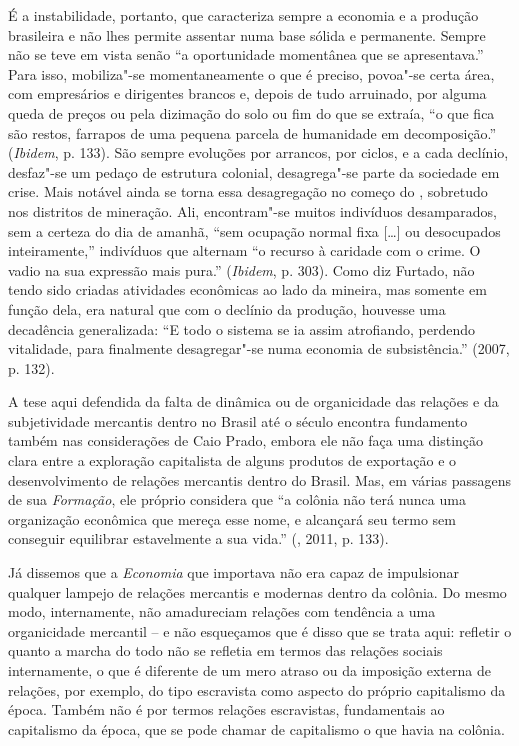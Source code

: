 É a instabilidade, portanto, que caracteriza sempre a economia e a
produção brasileira e não lhes permite assentar numa base sólida e
permanente. Sempre não se teve em vista senão ``a oportunidade
momentânea que se apresentava.'' Para isso, mobiliza"-se momentaneamente
o que é preciso, povoa"-se certa área, com empresários e dirigentes
brancos e, depois de tudo arruinado, por alguma queda de preços ou pela
dizimação do solo ou fim do que se extraía, ``o que fica são restos,
farrapos de uma pequena parcela de humanidade em decomposição.''
(\emph{Ibidem}, p. 133). São sempre evoluções por arrancos, por ciclos,
e a cada declínio, desfaz"-se um pedaço de estrutura colonial,
desagrega"-se parte da sociedade em crise. Mais notável ainda se torna
essa desagregação no começo do , sobretudo nos distritos de
mineração. Ali, encontram"-se muitos indivíduos desamparados, sem a
certeza do dia de amanhã, ``sem ocupação normal fixa [\ldots{}] ou
desocupados inteiramente,'' indivíduos que alternam ``o recurso à
caridade com o crime. O vadio na sua expressão mais pura.''
(\emph{Ibidem}, p. 303). Como diz Furtado, não tendo sido criadas
atividades econômicas ao lado da mineira, mas somente em função dela,
era natural que com o declínio da produção, houvesse uma decadência
generalizada: ``E todo o sistema se ia assim atrofiando, perdendo
vitalidade, para finalmente desagregar"-se numa economia de
subsistência.'' (2007, p. 132).

A tese aqui defendida da falta de dinâmica ou de organicidade das
relações e da subjetividade mercantis dentro no Brasil até o século 
encontra fundamento também nas considerações de Caio Prado, embora ele
não faça uma distinção clara entre a exploração capitalista de alguns
produtos de exportação e o desenvolvimento de relações mercantis dentro
do Brasil. Mas, em várias passagens de sua \emph{Formação}, ele próprio
considera que ``a colônia não terá nunca uma organização econômica que
mereça esse nome, e alcançará seu termo sem conseguir equilibrar
estavelmente a sua vida.'' (, 2011, p. 133).

Já dissemos que a \emph{Economia} que importava não era capaz de
impulsionar qualquer lampejo de relações mercantis e modernas dentro da
colônia. Do mesmo modo, internamente, não amadureciam relações com
tendência a uma organicidade mercantil -- e não esqueçamos que é disso
que se trata aqui: refletir o quanto a marcha do todo não se refletia em
termos das relações sociais internamente, o que é diferente de um mero
atraso ou da imposição externa de relações, por exemplo, do tipo
escravista como aspecto do próprio capitalismo da época. Também não é
por termos relações escravistas, fundamentais ao capitalismo da época,
que se pode chamar de capitalismo o que havia na colônia.

